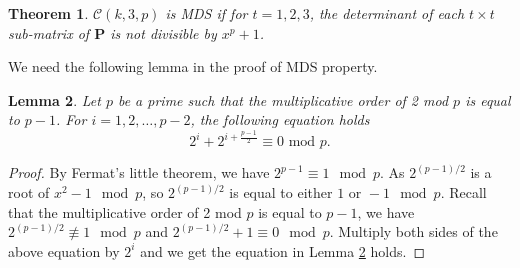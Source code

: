 \documentclass[conference]{IEEEtran}
\newtheorem{theorem}{Theorem}
\newtheorem{lemma}[theorem]{Lemma}
\begin{document}
\begin{theorem}
$\mathcal{C}(k,3,p)$ is MDS if for $t=1,2,3$, the determinant of each $t\times t$ sub-matrix of $\mathbf{P}$ is not divisible by $x^p+1$.
  \label{thm:MDS2}
\end{theorem}
We need the following lemma in the proof of MDS property.
\begin{lemma}
Let $p$ be a prime such that the multiplicative order of 2 mod $p$ is equal to $p-1$. For $i=1,2,\ldots,p-2$, the following equation holds
\[
2^i+2^{i+\frac{p-1}{2}}\equiv 0 \text{ mod }p.
\]
\label{lemmap}
\end{lemma}
\begin{proof}
By Fermat's little theorem, we have $2^{p-1}\equiv 1\mod p$. As $2^{(p-1)/2}$ is a root of $x^2-1 \mod p$, so $2^{(p-1)/2}$ is equal to either $1 \text{ or } -1 \mod p$. Recall that the multiplicative order of 2 mod $p$ is equal to $p-1$, we have $2^{(p-1)/2}\not\equiv 1\mod p$ and $2^{(p-1)/2}+1\equiv 0\mod p$. Multiply both sides of the above equation by $2^i$ and we get the equation in Lemma \ref{lemmap} holds.
\end{proof}
\end{document}
